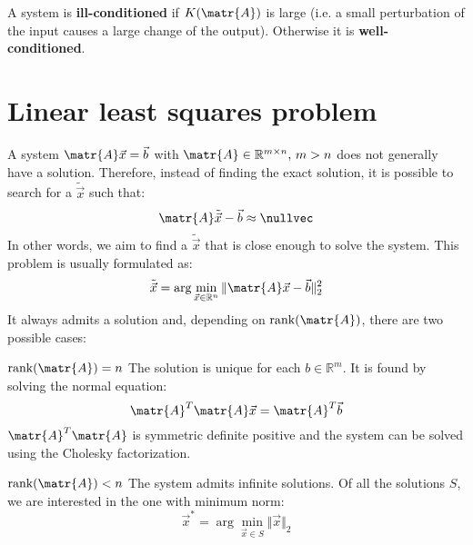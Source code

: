 A system is \textbf{ill-conditioned} if $K(\matr{A})$ is large 
(i.e. a small perturbation of the input causes a large change of the output).
Otherwise it is \textbf{well-conditioned}. 


\section{Linear least squares problem}

A system $\matr{A}\vec{x} = \vec{b}$ with $\matr{A} \in \mathbb{R}^{m \times n} \text{, } m > n$ 
does not generally have a solution.
Therefore, instead of finding the exact solution, it is possible to search for a $\tilde{\vec{x}}$ such that:
\[ \matr{A}\tilde{\vec{x}} - \vec{b} \approx \nullvec \]
In other words, we aim to find a $\tilde{\vec{x}}$ that is close enough to solve the system.
This problem is usually formulated as:
\[ 
    \tilde{\vec{x}} = \arg\min_{\vec{x} \in \mathbb{R}^n} \Vert \matr{A}\vec{x} - \vec{b} \Vert_2^2
\]
It always admits a solution and, depending on $\text{rank}(\matr{A})$, there are two possible cases:
\begin{descriptionlist}
    \item[$\text{rank}(\matr{A}) = n$] 
        The solution is unique for each $b \in \mathbb{R}^m$.
        It is found by solving the normal equation:
        \[ \matr{A}^T\matr{A}\vec{x} = \matr{A}^T\vec{b} \]
        $\matr{A}^T\matr{A}$ is symmetric definite positive and the system can be solved using the Cholesky factorization.
    
    \item[$\text{rank}(\matr{A}) < n$]
        The system admits infinite solutions.
        Of all the solutions $S$, we are interested in the one with minimum norm:
        \[ \vec{x}^* = \arg\min_{\vec{x} \in S} \Vert \vec{x} \Vert_2 \]
\end{descriptionlist}
